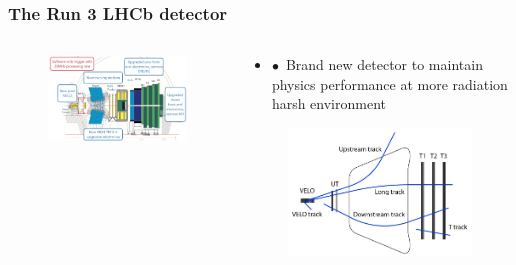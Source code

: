 \documentclass[aspectratio=1610, 12pt, xcolor=dvipsnames]{beamer}
\begin{document}
\begin{frame}\frametitle{The Run 3 LHCb detector}
  \begin{columns}
    \begin{column}[c]{0.6\textwidth}
      \begin{figure}
        \includegraphics[width=\textwidth]{plots/lhcb_upgrade.png}
      \end{figure}
    \end{column}
    \begin{column}{0.48\textwidth}
      \begin{itemize}
        \item $\bullet$\, Brand new detector to maintain physics performance at more radiation harsh environment
      \end{itemize}
      \begin{figure}
        \centering
        \includegraphics[width=\textwidth]{track.png}

\end{figure}
\end{column}
\end{columns}
\end{frame}
\end{document}

